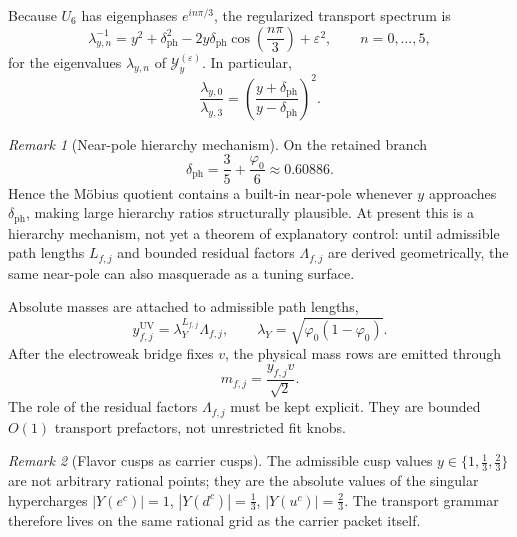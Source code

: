 \documentclass[11pt,a4paper]{article}
\theoremstyle{definition}
\theoremstyle{remark}
\newtheorem*{remark}{Remark}
\newcommand{\phiz}{\varphi_0}
\newcommand{\lambdaY}{\lambda_Y}
\begin{document}
Because $U_6$ has eigenphases $e^{in\pi/3}$, the regularized transport spectrum is
\begin{equation}
\label{eq:transport-spectrum}
\lambda_{y,n}^{-1}
=
y^2+\delta_{\mathrm{ph}}^2-2y\delta_{\mathrm{ph}}\cos\!\left(\frac{n\pi}{3}\right)+\varepsilon^2,
\qquad
n=0,\dots,5,
\end{equation}
for the eigenvalues $\lambda_{y,n}$ of $\mathcal Y_y^{(\varepsilon)}$. In particular,
\begin{equation}
\label{eq:mobius-quotient}
\frac{\lambda_{y,0}}{\lambda_{y,3}}
=
\left(\frac{y+\delta_{\mathrm{ph}}}{y-\delta_{\mathrm{ph}}}\right)^2.
\end{equation}
\begin{remark}[Near-pole hierarchy mechanism]
On the retained branch
\[
\delta_{\mathrm{ph}}=\frac35+\frac{\phiz}{6}\approx \num{0.60886}.
\]
Hence the Möbius quotient contains a built-in near-pole whenever $y$ approaches $\delta_{\mathrm{ph}}$, making large hierarchy ratios structurally plausible. At present this is a hierarchy mechanism, not yet a theorem of explanatory control: until admissible path lengths $L_{f,j}$ and bounded residual factors $\Lambda_{f,j}$ are derived geometrically, the same near-pole can also masquerade as a tuning surface.
\end{remark}

Absolute masses are attached to admissible path lengths,
\begin{equation}
\label{eq:path-length-yukawa}
y_{f,j}^{\mathrm{UV}}=\lambdaY^{L_{f,j}}\Lambda_{f,j},
\qquad
\lambdaY=\sqrt{\phiz(1-\phiz)}.
\end{equation}
After the electroweak bridge fixes $v$, the physical mass rows are emitted through
\begin{equation}
\label{eq:mass-bridge}
m_{f,j}=\frac{y_{f,j}v}{\sqrt2}.
\end{equation}
The role of the residual factors $\Lambda_{f,j}$ must be kept explicit. They are bounded $O(1)$ transport prefactors, not unrestricted fit knobs.

\begin{remark}[Flavor cusps as carrier cusps]
The admissible cusp values $y\in\{1,\frac13,\frac23\}$ are not arbitrary rational points; they are the absolute values of the singular hypercharges $|Y(e^c)|=1$, $|Y(d^c)|=\frac13$, $|Y(u^c)|=\frac23$. The transport grammar therefore lives on the same rational grid as the carrier packet itself.
\end{remark}
\end{document}
